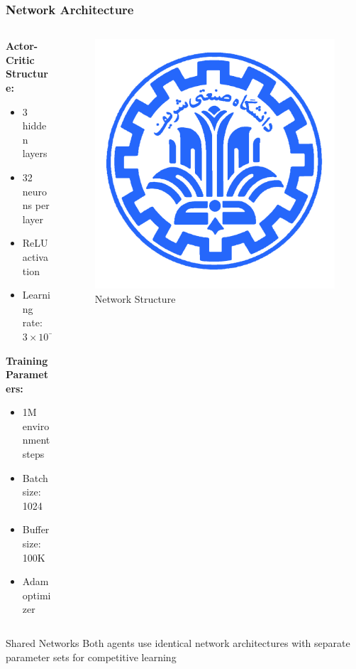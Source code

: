 \documentclass[
    11pt, %
    aspectratio=169, %
]{beamer}
\begin{document}
\begin{frame}
	\frametitle{Network Architecture}
	
	\begin{columns}[t]
		\begin{column}{0.5\textwidth}
			\textbf{Actor-Critic Structure:}
			\begin{itemize}
				\item 3 hidden layers
				\item 32 neurons per layer
				\item ReLU activation
				\item Learning rate: $3 \times 10^{-4}$
			\end{itemize}
			
			\vspace{0.3cm}
			\textbf{Training Parameters:}
			\begin{itemize}
				\item 1M environment steps
				\item Batch size: 1024
				\item Buffer size: 100K
				\item Adam optimizer
			\end{itemize}
		\end{column}
		\begin{column}{0.5\textwidth}
			\begin{figure}
				\centering
				\includegraphics[width=\textwidth]{network_architecture.png}
				\caption{Network Structure}
			\end{figure}
		\end{column}
	\end{columns}
	
	\begin{block}{Shared Networks}
		Both agents use identical network architectures with separate parameter sets for competitive learning
	\end{block}
\end{frame}
\end{document}
